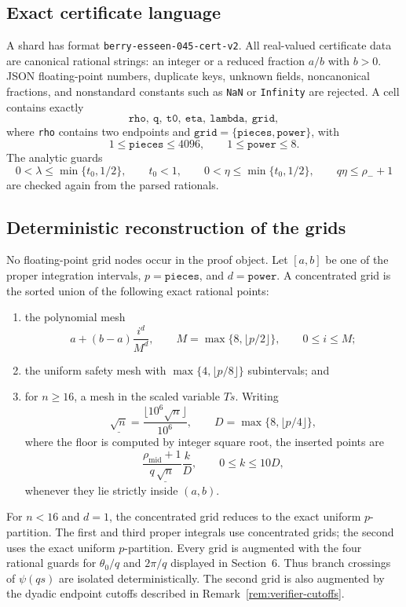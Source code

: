 \documentclass[11pt,a4paper,twoside]{article}
\theoremstyle{remark}
\newcommand{\code}[1]{\texttt{#1}}
\begin{document}
\subsection{Exact certificate language}

A shard has format \code{berry-esseen-045-cert-v2}.  All real-valued
certificate data are canonical rational strings: an integer or a reduced
fraction \(a/b\) with \(b>0\).  JSON floating-point numbers, duplicate keys,
unknown fields, noncanonical fractions, and nonstandard constants such as
\code{NaN} or \code{Infinity} are rejected.  A cell contains exactly
\[
 \code{rho},\ \code{q},\ \code{t0},\ \code{eta},\
 \code{lambda},\ \code{grid},
\]
where \code{rho} contains two endpoints and
\(\code{grid}=\{\code{pieces},\code{power}\}\), with
\[
 1\le\code{pieces}\le4096,
 \qquad
 1\le\code{power}\le8.
\]
The analytic guards
\[
 0<\lambda\le\min\{t_0,1/2\},\qquad t_0<1,\qquad
 0<\eta\le\min\{t_0,1/2\},\qquad
 q\eta\le\rho_-+1
\]
are checked again from the parsed rationals.

\subsection{Deterministic reconstruction of the grids}

No floating-point grid nodes occur in the proof object.  Let \([a,b]\) be
one of the proper integration intervals, \(p=\code{pieces}\), and
\(d=\code{power}\).  A concentrated grid is the sorted union of the
following exact rational points:

\begin{enumerate}[label=(\roman*),leftmargin=2.2em]
\item the polynomial mesh
\[
 a+(b-a)\frac{i^d}{M^d},
 \qquad
 M=\max\{8,\lfloor p/2\rfloor\},
 \qquad
 0\le i\le M;
\]
\item the uniform safety mesh with
\(\max\{4,\lfloor p/8\rfloor\}\) subintervals; and
\item for \(n\ge16\), a mesh in the scaled variable \(Ts\).
Writing
\[
 \underline{\sqrt n}
 =
 \frac{\lfloor10^6\sqrt n\rfloor}{10^6},
 \qquad
 D=\max\{8,\lfloor p/4\rfloor\},
\]
where the floor is computed by integer square root, the inserted points are
\[
 \frac{\rho_{\mathrm{mid}}+1}
      {q\,\underline{\sqrt n}}\frac{k}{D},
 \qquad
 0\le k\le10D,
\]
whenever they lie strictly inside \((a,b)\).
\end{enumerate}

For \(n<16\) and \(d=1\), the concentrated grid reduces to the exact
uniform \(p\)-partition.  The first and third proper integrals use
concentrated grids; the second uses the exact uniform \(p\)-partition.
Every grid is augmented with the four rational guards for
\(\theta_0/q\) and \(2\pi/q\) displayed in Section~6.  Thus branch crossings
of \(\psi(qs)\) are isolated deterministically.  The second grid is also
augmented by the dyadic endpoint cutoffs described in
Remark~\ref{rem:verifier-cutoffs}.
\end{document}

